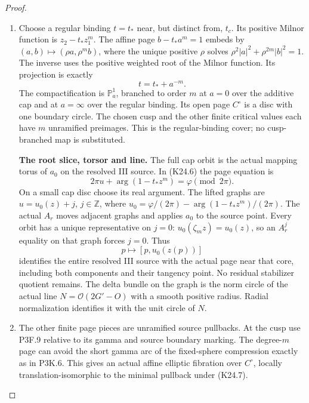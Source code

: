 \begin{proof}
\begin{enumerate}[label=\arabic*.]
\item Choose a regular binding $t=t_*$ near, but distinct from,
$t_c$. Its positive Milnor function is $z_2-t_*z_1^m$.
The affine page $b-t_*a^m=1$ embeds by
$(a,b)\mapsto(\rho a,\rho^mb)$, where the unique positive
$\rho$ solves $\rho^2|a|^2+\rho^{2m}|b|^2=1$.
The inverse uses the positive weighted root of the Milnor
function. Its projection is exactly
\[
                         t=t_*+a^{-m}.                 \tag{K24.7}
\]
The compactification is $\mathbb P^1_a$, branched to order
$m$ at $a=0$ over the additive cap and at $a=\infty$ over
the regular binding. Its open page $C^\circ$ is a disc with
one boundary circle. The chosen cusp and the other finite
critical values each have $m$ unramified preimages. This is
the regular-binding cover; no cusp-branched map is substituted.

\par\medskip\noindent\textbf{The root slice, torsor and line.}
The full cap orbit is the actual mapping torus of $a_0$ on
the resolved III source. In (K24.6) the page equation is
\[
 2\pi u+\arg(1-t_*z^m)=\varphi\pmod{2\pi}.
\]
On a small cap disc choose its real argument. The lifted
graphs are $u=u_0(z)+j$, $j\in\mathbb Z$, where
$u_0=\varphi/(2\pi)-\arg(1-t_*z^m)/(2\pi)$.
The actual $A_r$ moves adjacent graphs and applies $a_0$ to
the source point. Every orbit has a unique representative
on $j=0$: $u_0(\zeta_mz)=u_0(z)$, so an $A_r^j$ equality
on that graph forces $j=0$. Thus
\[
                         p\longmapsto[p,u_0(z(p))]
\]
identifies the entire resolved III source with the actual page
near that core, including both components and their tangency
point. No residual stabilizer quotient remains. The delta
bundle on the graph is the norm circle of the actual line
$N=\mathcal O(2G'-O)$ with a smooth positive radius. Radial
normalization identifies it with the unit circle of $N$.

\item The other finite page pieces are unramified source pullbacks.
At the cusp use P3F.9 relative to its gamma and source boundary
marking. The degree-$m$ page can avoid the short gamma arc of
the fixed-sphere compression exactly as in P3K.6. This gives
an actual affine elliptic fibration over $C^\circ$, locally
translation-isomorphic to the minimal pullback under (K24.7).


\end{enumerate}
\end{proof}

